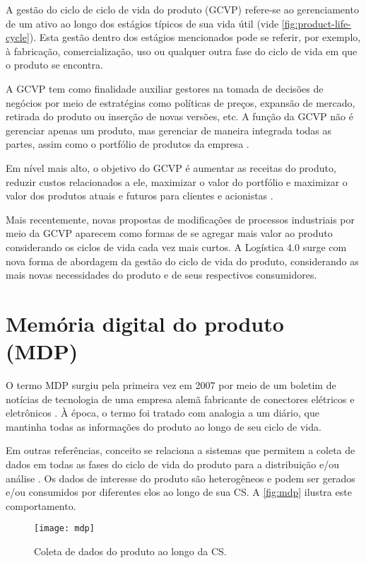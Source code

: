 A gestão do ciclo de ciclo de vida do produto (GCVP) refere-se ao gerenciamento de um ativo ao longo dos estágios típicos de sua vida útil (vide \autoref{fig:product-life-cycle}). Esta gestão dentro dos estágios mencionados pode se referir, por exemplo, à fabricação, comercialização, uso ou qualquer outra fase do ciclo de vida em que o produto se encontra.

A GCVP tem como finalidade auxiliar gestores na tomada de decisões de negócios por meio de estratégias como políticas de preços, expansão de mercado, retirada do produto ou inserção de novas versões, etc. A função da GCVP não é gerenciar apenas um produto, mas gerenciar de maneira integrada todas as partes, assim como o portfólio de produtos da empresa \cite{stark2015lifecycle}.

Em nível mais alto, o objetivo do GCVP é aumentar as receitas do produto, reduzir custos relacionados a ele, maximizar o valor do portfólio e maximizar o valor dos produtos atuais e futuros para clientes e acionistas \cite{stark2015lifecycle}.

Mais recentemente, novas propostas de modificações de processos industriais por meio da GCVP aparecem como formas de se agregar mais valor ao produto considerando os ciclos de vida cada vez mais curtos. A Logística 4.0 surge com nova forma de abordagem da gestão do ciclo de vida do produto, considerando as mais novas necessidades do produto e de seus respectivos consumidores.

\section{Memória digital do produto (MDP)}
\label{sec:mdp}

O termo MDP surgiu pela primeira vez em 2007 por meio de um boletim de notícias de tecnologia de uma empresa alemã fabricante de conectores elétricos e eletrônicos \cite{wahlster2007digitalmemory}. À época, o termo foi tratado com analogia a um diário, que mantinha todas as informações do produto ao longo de seu ciclo de vida.

Em outras referências, conceito se relaciona a sistemas que permitem a coleta de dados em todas as fases do ciclo de vida do produto para a distribuição e/ou análise \cite{brandherm2011productmemory,blume2014mdp}. Os dados de interesse do produto são heterogêneos e podem ser gerados e/ou consumidos por diferentes elos ao longo de sua CS. A \autoref{fig:mdp} ilustra este comportamento.

\begin{figure}[t]
	\centering
	\texttt{[image: mdp]}
	\caption{Coleta de dados do produto ao longo da CS.}
	\label{fig:mdp}
\end{figure}

